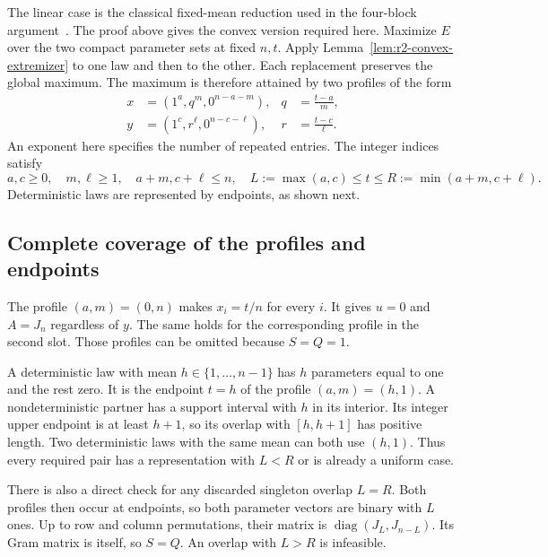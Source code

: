 \documentclass[11pt,a4paper]{article}
\theoremstyle{definition}
\theoremstyle{remark}
\begin{document}
The linear case is the classical fixed-mean reduction used in the four-block argument~\cite{hoeffding56}.
The proof above gives the convex version required here.
Maximize $E$ over the two compact parameter sets at fixed $n,t$.
Apply Lemma~\ref{lem:r2-convex-extremizer} to one law and then to the other.
Each replacement preserves the global maximum.
The maximum is therefore attained by two profiles of the form
\begin{equation}\label{eq:r2-profiles}
\begin{aligned}
x&=(1^a,q^m,0^{n-a-m}),&q&=\frac{t-a}{m},\\
y&=(1^c,r^\ell,0^{n-c-\ell}),&r&=\frac{t-c}{\ell}.
\end{aligned}
\end{equation}
An exponent here specifies the number of repeated entries.
The integer indices satisfy
\begin{equation}\label{eq:r2-overlap}
a,c\ge0,\quad m,\ell\ge1,\quad a+m,c+\ell\le n,
\quad L:=\max(a,c)\le t\le R:=\min(a+m,c+\ell).
\end{equation}
Deterministic laws are represented by endpoints, as shown next.

\subsection{Complete coverage of the profiles and endpoints}

The profile $(a,m)=(0,n)$ makes $x_i=t/n$ for every $i$.
It gives $u=0$ and $A=J_n$ regardless of $y$.
The same holds for the corresponding profile in the second slot.
Those profiles can be omitted because $S=Q=1$.

A deterministic law with mean $h\in\{1,\ldots,n-1\}$ has $h$ parameters equal to one and the rest zero.
It is the endpoint $t=h$ of the profile $(a,m)=(h,1)$.
A nondeterministic partner has a support interval with $h$ in its interior.
Its integer upper endpoint is at least $h+1$, so its overlap with $[h,h+1]$ has positive length.
Two deterministic laws with the same mean can both use $(h,1)$.
Thus every required pair has a representation with $L<R$ or is already a uniform case.

There is also a direct check for any discarded singleton overlap $L=R$.
Both profiles then occur at endpoints, so both parameter vectors are binary with $L$ ones.
Up to row and column permutations, their matrix is
$\operatorname{diag}(J_L,J_{n-L})$.
Its Gram matrix is itself, so $S=Q$.
An overlap with $L>R$ is infeasible.
\end{document}
